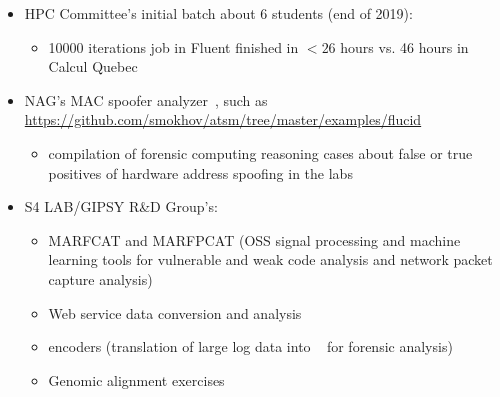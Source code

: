 \begin{itemize}
	\item HPC Committee's initial batch about 6 students (end of 2019):
	\begin{itemize}
		\item 10000 iterations job in Fluent finished in $<26$ hours vs. 46 hours in Calcul Quebec
	\end{itemize}

	\item NAG's MAC spoofer analyzer~\cite{mac-spoofer-analyzer-intro-c3s2e2014,mac-spoofer-analyzer-detail-fps2014},
	such as \url{https://github.com/smokhov/atsm/tree/master/examples/flucid}
	\begin{itemize}
		\item compilation of forensic computing reasoning cases about false or true positives of hardware address spoofing in the labs
	\end{itemize}

	\item S4 LAB/GIPSY R\&D Group's:
	\begin{itemize}
		\item MARFCAT and MARFPCAT (OSS signal processing and machine learning tools for
		vulnerable and weak code analysis and network packet capture
		analysis)~\cite{marfcat-nlp-ai2014,marfcat-sate2010-nist,fingerprinting-mal-traffic}
		\item Web service data conversion and analysis
		\item {\flucid} encoders (translation of large log data into {\flucid}~\cite{mokhov-phd-thesis-2013} for forensic analysis)
		\item Genomic alignment exercises
	\end{itemize}


\end{itemize}
